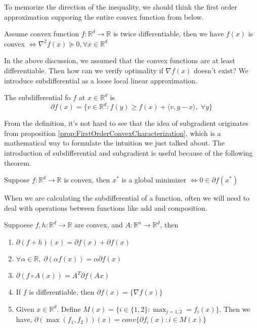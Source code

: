 \begin{note}
    To memorize the direction of the inequality, we should think the first order approximation supporing the entire convex function from below. 
\end{note}

\begin{lemma}
    Assume convex function $f: \mathbb{R}^d \rightarrow \mathbb{R}$ is twice differentiable, then we have $f(x)$ is convex $\iff \nabla^2f(x) \succeq 0, \forall x \in \mathbb{R}^d$
\end{lemma}


In the above discussion, we assumed that the convex functions are at least differentiable. Then how can we verify optimality if $\nabla f(x)$ doesn't exist? We introduce subdifferential as a loose local linear approximation.

\begin{definition}[Subdifferential]
    The subdifferential fo $f$ at $x \in \mathbb{R}^d$ is
    \begin{equation*}
        \partial f(x) = \{ v \in \mathbb{R}^d : f(y) \geq f(x) + \langle v, y-x \rangle,\; \forall y\}
    \end{equation*}
\end{definition}

From the definition, it's not hard to see that the idea of subgradient originates from proposition \ref{prop:FirstOrderConvexCharacterization}, which is a mathematical way to formulate the intuition we just talked about. The introduction of subdifferential and subgradient is useful because of the following theorem.

\begin{theorem}
    Suppose $f: \mathbb{R}^d \rightarrow \mathbb{R}$ is convex, then $x^*$ is a global minimizer $\iff 0 \in \partial f(x^*)$
\end{theorem}

When we are calculating the subdifferential of a function, often we will need to deal with operations between functions like add and composition. 

\begin{proposition}
    Suppoese $f, h: \mathbb{R}^d \rightarrow \mathbb{R}$ are convex, and $A:\mathbb{R}^n \rightarrow \mathbb{R}^d$, then
    \begin{enumerate}
        \item $\partial(f+h)(x) = \partial f(x) + \partial f(x)$
        \item $\forall \alpha \in \mathbb{R}, \; \partial(\alpha f(x)) = \alpha \partial f(x)$
        \item $\partial(f \circ A(x)) = A^T \partial f(Ax)$
        \item If $f$ is differentiable, then $\partial f(x) = \{ \nabla f(x) \}$
        \item Given $x \in \mathbb{R}^d$. Define $M(x) = \{ i \in \{1,2\} : \max_{j=1,2} = f_i(x) \}$. Then we have, $\partial(\max(f_1, f_2))(x) = conv\{ \partial f_i(x) : i \in M(x) \}$
    \end{enumerate}    
\end{proposition}